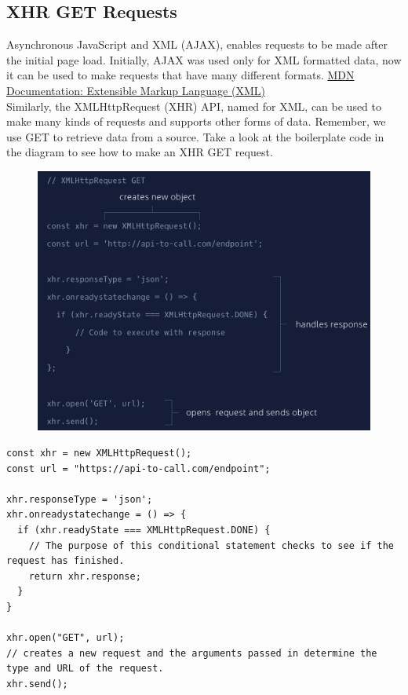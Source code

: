 \documentclass[11pt]{article}
\begin{document}
\subsection{XHR GET Requests}
Asynchronous JavaScript and XML (AJAX), enables requests to be made after the initial page load. Initially, AJAX was used only for XML formatted data, now it can be used to make requests that have many different formats. \href{https://developer.mozilla.org/en-US/docs/Web/XML/XML_introduction}{MDN Documentation: Extensible Markup Language (XML)} \\
\newline
Similarly, the XMLHttpRequest (XHR) API, named for XML, can be used to make many kinds of requests and supports other forms of data. Remember, we use GET to retrieve data from a source. Take a look at the boilerplate code in the diagram to see how to make an XHR GET request.
\begin{figure}[H]
\includegraphics[scale = 0.35]{17_1}
\centering
\end{figure}
\begin{lstlisting}
const xhr = new XMLHttpRequest(); 
const url = "https://api-to-call.com/endpoint";

xhr.responseType = 'json'; 
xhr.onreadystatechange = () => {
  if (xhr.readyState === XMLHttpRequest.DONE) {
    // The purpose of this conditional statement checks to see if the request has finished.
    return xhr.response; 
  }
}

xhr.open("GET", url); 
// creates a new request and the arguments passed in determine the type and URL of the request.
xhr.send(); 
\end{lstlisting}
\end{document}
